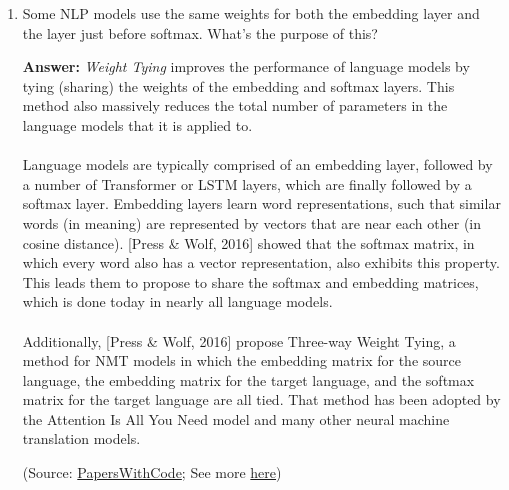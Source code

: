 \documentclass{article}
\newenvironment{QandA}{\begin{enumerate}[label=\arabic*.]}{\end{enumerate}}
\newenvironment{answer}{\par\normalfont \textbf{Answer:}}{}
\begin{document}
\begin{QandA}
    \item Some NLP models use the same weights for both the embedding layer and the layer just before softmax. What’s the purpose of this?
    \begin{answer}
        \textit{Weight Tying} improves the performance of language models by tying (sharing) the weights of the embedding and softmax layers. This method also massively reduces the total number of parameters in the language models that it is applied to.\\\\
        Language models are typically comprised of an embedding layer, followed by a number of Transformer or LSTM layers, which are finally followed by a softmax layer. Embedding layers learn word representations, such that similar words (in meaning) are represented by vectors that are near each other (in cosine distance). [Press \& Wolf, 2016] showed that the softmax matrix, in which every word also has a vector representation, also exhibits this property. This leads them to propose to share the softmax and embedding matrices, which is done today in nearly all language models.\\\\
        Additionally, [Press \& Wolf, 2016] propose Three-way Weight Tying, a method for NMT models in which the embedding matrix for the source language, the embedding matrix for the target language, and the softmax matrix for the target language are all tied. That method has been adopted by the Attention Is All You Need model and many other neural machine translation models.

        (Source: \href{https://paperswithcode.com/method/weight-tying}{PapersWithCode}; See more \href{https://tomroth.com.au/weight_tying/}{here})
    \end{answer}
\end{QandA}
\end{document}
